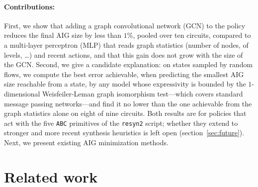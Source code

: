 \documentclass{article}
\begin{document}
\paragraph{Contributions:} First, we show that adding a graph convolutional network (GCN) to the policy reduces the final AIG size by less than $1\%$, pooled over ten circuits, compared to a multi-layer perceptron (MLP) that reads graph statistics (number of nodes, of levels, \dots) and recent actions, and that this gain does not grow with the size of the GCN.
Second, we give a candidate explanation: on states sampled by random flows, we compute the best error achievable, when predicting the smallest AIG size reachable from a state, by any model whose expressivity is bounded by the $1$-dimensional Weisfeiler-Leman graph isomorphism test---which covers standard message passing networks---and find it no lower than the one achievable from the graph statistics alone on eight of nine circuits.
Both results are for policies that act with the five \texttt{ABC} primitives of the \texttt{resyn2} script; whether they extend to stronger and more recent synthesis heuristics is left open (section~\ref{sec:future}).
Next, we present existing AIG minimization methods.

\section{Related work}\label{sec:relwork}
\end{document}
